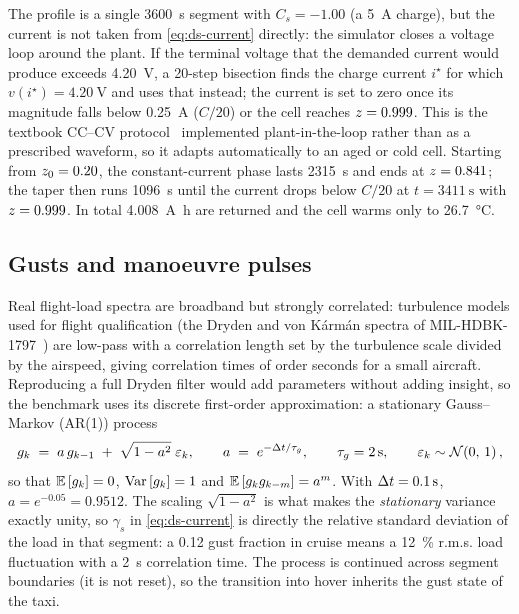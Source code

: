 The profile is a single \SI{3600}{\second} segment with $C_s=-1.00$ (a \SI{5}{\ampere} charge), but
the current is not taken from \eqref{eq:ds-current} directly: the simulator closes a voltage loop
around the plant. If the terminal voltage that the demanded current would produce exceeds
\SI{4.20}{\volt}, a 20-step bisection finds the charge current $i^\star$ for which
$v(i^\star)=\SI{4.20}{\volt}$ and uses that instead; the current is set to zero once its magnitude
falls below \SI{0.25}{\ampere} ($C/20$) or the cell reaches $z=0.999$. This is the textbook
CC--CV protocol~\cite{plett2015bms1} implemented plant-in-the-loop rather than as a prescribed
waveform, so it adapts automatically to an aged or cold cell. Starting from $z_0=0.20$, the
constant-current phase lasts \SI{2315}{\second} and ends at $z=0.841$; the taper then runs
\SI{1096}{\second} until the current drops below $C/20$ at $t=\SI{3411}{\second}$ with
$z=0.999$. In total \SI{4.008}{\ampere\hour} are returned and the cell warms only to
\SI{26.7}{\celsius}.


\subsection{Gusts and manoeuvre pulses}
\label{sec:ds-gust}

Real flight-load spectra are broadband but strongly correlated: turbulence models used for flight
qualification (the Dryden and von K\'arm\'an spectra of MIL-HDBK-1797~\cite{milhdbk1797}) are
low-pass with a correlation length set by the turbulence scale divided by the airspeed, giving
correlation times of order seconds for a small aircraft. Reproducing a full Dryden filter would add
parameters without adding insight, so the benchmark uses its discrete first-order approximation: a
stationary Gauss--Markov (AR(1)) process
\begin{equation}
g_k \;=\; a\,g_{k-1} \;+\; \sqrt{1-a^2}\;\varepsilon_k, \qquad
a \;=\; e^{-\Delta t/\tau_g}, \qquad \tau_g = \SI{2}{\second}, \qquad
\varepsilon_k \sim \mathcal{N}\!\left(0,\,1\right),
\label{eq:ds-ar1}
\end{equation}
so that $\mathbb{E}\left[g_k\right]=0$, $\operatorname{Var}\left[g_k\right]=1$ and $\mathbb{E}\left[g_k g_{k-m}\right] = a^{m}$. With $\Delta t=\SI{0.1}{\second}$,
$a = e^{-0.05} = 0.9512$. The scaling $\sqrt{1-a^2}$ is what makes the \emph{stationary} variance
exactly unity, so $\gamma_s$ in \eqref{eq:ds-current} is directly the relative standard deviation
of the load in that segment: a \num{0.12} gust fraction in cruise means a \SI{12}{\percent} r.m.s.
load fluctuation with a \SI{2}{\second} correlation time. The process is continued across segment
boundaries (it is not reset), so the transition into hover inherits the gust state of the taxi.

